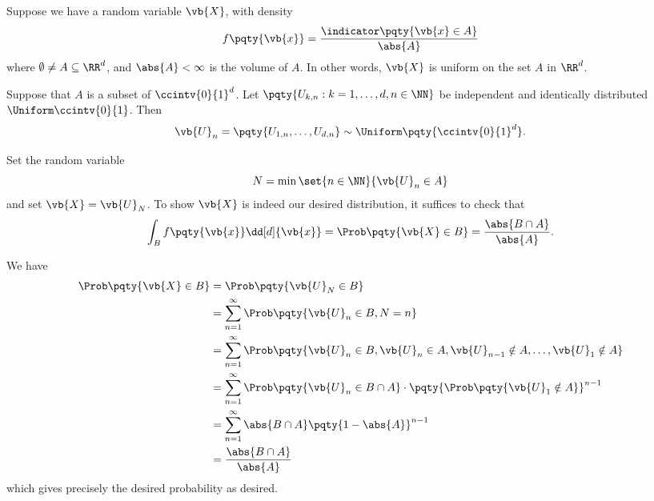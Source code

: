\begin{example}
    \label{ex:rejection-sampling}%
    Suppose we have a random variable \(\vb{X}\), with density
    \[
        f\pqty{\vb{x}} = \frac{\indicator \pqty{\vb{x} \in A}}{\abs{A}}
    \]
    where \(\emptyset \neq A \subseteq \RR^d\), and \(\abs{A} < \infty\) is the volume of \(A\). In other words, \(\vb{X}\) is uniform on the set \(A\) in \(\RR^d\).

    Suppose that \(A\) is a subset of \(\ccintv{0}{1}^d\). Let \(\pqty{U_{k, n} : k = 1, \ldots, d, n \in \NN}\) be independent and identically distributed \(\Uniform \ccintv{0}{1}\). Then
    \[
        \vb{U}_n = \pqty{U_{1, n}, \ldots, U_{d, n}} \sim \Uniform\pqty{\ccintv{0}{1}^d}.
    \]

    Set the random variable
    \[
        N = \min \set{n \in \NN}{\vb{U}_n \in A}
    \]
    and set \(\vb{X} = \vb{U}_N\). To show \(\vb{X}\) is indeed our desired distribution, it suffices to check that
    \[
        \int_{B} f\pqty{\vb{x}} \dd[d]{\vb{x}} = \Prob\pqty{\vb{X} \in B} = \frac{\abs{B \cap A}}{\abs{A}}.
    \]

    We have
    \begin{align*}
        \Prob\pqty{\vb{X} \in B} &= \Prob\pqty{\vb{U}_N \in B} \\
        &= \sum_{n = 1}^{\infty} \Prob\pqty{\vb{U}_n \in B, N = n} \\
        &= \sum_{n = 1}^{\infty} \Prob\pqty{\vb{U}_n \in B, \vb{U}_n \in A, \vb{U}_{n - 1} \notin A, \ldots, \vb{U}_1 \notin A} \\
        &= \sum_{n = 1}^{\infty} \Prob\pqty{\vb{U}_n \in B \cap A} \cdot \pqty{\Prob\pqty{\vb{U}_1 \notin A}}^{n - 1} \\
        &= \sum_{n = 1}^{\infty} \abs{B \cap A} \pqty{1 - \abs{A}}^{n - 1} \\
        &= \frac{\abs{B \cap A}}{\abs{A}}
    \end{align*}
    which gives precisely the desired probability as desired.
\end{example}